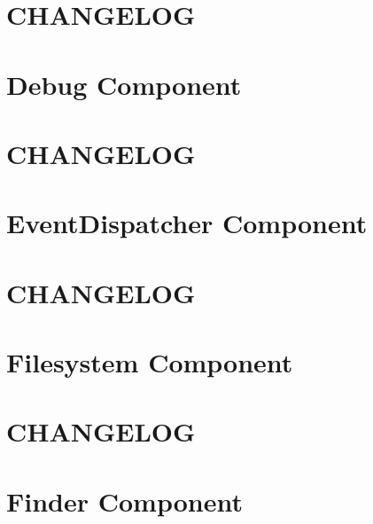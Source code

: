 \documentclass[twoside]{book}
\newcommand{\+}{\discretionary{\mbox{\scriptsize$\hookleftarrow$}}{}{}}
\begin{document}
\chapter{C\+H\+A\+N\+G\+E\+L\+O\+G}
\label{md_vendor_symfony_debug__symfony__component__debug__c_h_a_n_g_e_l_o_g}

\chapter{Debug Component}
\label{md_vendor_symfony_debug__symfony__component__debug__r_e_a_d_m_e}

\chapter{C\+H\+A\+N\+G\+E\+L\+O\+G}
\label{md_vendor_symfony_event-dispatcher__symfony__component__event_dispatcher__c_h_a_n_g_e_l_o_g}

\chapter{Event\+Dispatcher Component}
\label{md_vendor_symfony_event-dispatcher__symfony__component__event_dispatcher__r_e_a_d_m_e}

\chapter{C\+H\+A\+N\+G\+E\+L\+O\+G}
\label{md_vendor_symfony_filesystem__symfony__component__filesystem__c_h_a_n_g_e_l_o_g}

\chapter{Filesystem Component}
\label{md_vendor_symfony_filesystem__symfony__component__filesystem__r_e_a_d_m_e}

\chapter{C\+H\+A\+N\+G\+E\+L\+O\+G}
\label{md_vendor_symfony_finder__symfony__component__finder__c_h_a_n_g_e_l_o_g}

\chapter{Finder Component}
\label{md_vendor_symfony_finder__symfony__component__finder__r_e_a_d_m_e}

\end{document}

